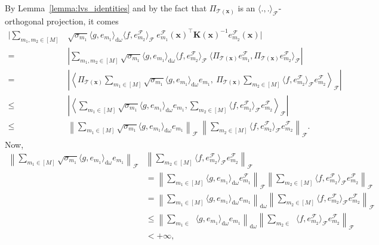 \documentclass[twoside,11pt]{book}
\DeclareMathOperator{\Tran}{\intercal}
\DeclareMathOperator{\F}{\mathcal{F}}
\DeclareMathOperator{\Ns}{\mathbb{N}^{*}}
\begin{document}
By Lemma~\ref{lemma:lvs_identities} and by the fact that $\Pi_{\mathcal{T}(\bm{x})}$ is an $\langle.,.\rangle_{\F}$-orthogonal projection, it comes
\begin{align}
\Bigg|\sum_{m_{1}, m_2 \in [M]} &\sqrt{\sigma_{m_{1}}} \langle g, e_{m_{1}} \rangle_{\mathrm{d}\omega} \langle f, e_{m_{2}}^{\F} \rangle_{\F}  \: e_{m_{1}}^{\F}(\bm{x})^{\Tran} \bm{K}(\bm{x})^{-1}e_{m_{2}}^{\F}(\bm{x}) \Bigg| \\
= & \left|\sum_{m_{1}, m_2 \in [M]} \sqrt{\sigma_{m_{1}}} \langle g, e_{m_{1}} \rangle_{\mathrm{d}\omega}  \langle f, e_{m_{2}}^{\F} \rangle_{\F}  \: \langle \Pi_{\mathcal{T}(\bm{x})}e_{m_{1}}^{\F}, \Pi_{\mathcal{T}(\bm{x})}e_{m_{2}}^{\F} \rangle_{\F} \right|\\
= & \left| \left\langle \Pi_{\mathcal{T}(\bm{x})} \sum\limits_{m_{1} \in [M] }  \sqrt{\sigma_{m_{1}}} \langle g, e_{m_{1}} \rangle_{\mathrm{d}\omega}   e_{m_{1}},\:  \Pi_{\mathcal{T}(\bm{x})} \sum\limits_{m_{2} \in [M]} \langle f, e_{m_{2}}^{\F} \rangle_{\F} e_{m_{2}}^{\F} \right\rangle_{\F} \right|\\
\leq & \left| \left\langle \sum\limits_{m_{1} \in [M] }  \sqrt{\sigma_{m_{1}}} \langle g, e_{m_{1}} \rangle_{\mathrm{d}\omega}   e_{m_{1}},  \sum\limits_{m_{2} \in [M]} \langle f, e_{m_{2}}^{\F} \rangle_{\F} e_{m_{2}}^{\F} \right\rangle_{\F} \right|\\
\leq & \left\| \sum\limits_{m_{1} \in [M] }  \sqrt{\sigma_{m_{1}}} \langle g, e_{m_{1}} \rangle_{\mathrm{d}\omega}   e_{m_{1}} \right\|_{\F}\: \left \| \sum\limits_{m_{2} \in [M]} \langle f, e_{m_{2}}^{\F} \rangle_{\F} e_{m_{2}}^{\F} \right\|_{\F}.
\end{align}
Now,
\begin{align}
\left\| \sum\limits_{m_{1} \in [M] }  \sqrt{\sigma_{m_{1}}} \langle g, e_{m_{1}} \rangle_{\mathrm{d}\omega}   e_{m_{1}} \right\|_{\F}  & \left \| \sum\limits_{m_{2} \in [M]} \langle f, e_{m_{2}}^{\F} \rangle_{\F} e_{m_{2}}^{\F} \right\|_{\F}\\
&  = \left\| \sum\limits_{m_{1} \in [M] }  \langle g, e_{m_{1}} \rangle_{\mathrm{d}\omega}   e_{m_{1}}^{\F} \right\|_{\F} \left \| \sum\limits_{m_{2} \in [M]} \langle f, e_{m_{2}}^{\F} \rangle_{\F} e_{m_{2}}^{\F} \right\|_{\F}\\
&  = \left\| \sum\limits_{m_{1} \in [M] }  \langle g, e_{m_{1}} \rangle_{\mathrm{d}\omega}   e_{m_{1}} \right\|_{\mathrm{d}\omega} \left \| \sum\limits_{m_{2} \in [M]} \langle f, e_{m_{2}}^{\F} \rangle_{\F} e_{m_{2}}^{\F} \right\|_{\F}\\
&  \leq \left\| \sum\limits_{m_{1} \in \Ns }  \langle g, e_{m_{1}} \rangle_{\mathrm{d}\omega}   e_{m_{1}} \right\|_{\mathrm{d}\omega} \left \| \sum\limits_{m_{2} \in \Ns} \langle f, e_{m_{2}}^{\F} \rangle_{\F} e_{m_{2}}^{\F} \right\|_{\F}\\
& < +\infty,
\end{align}
\end{document}
